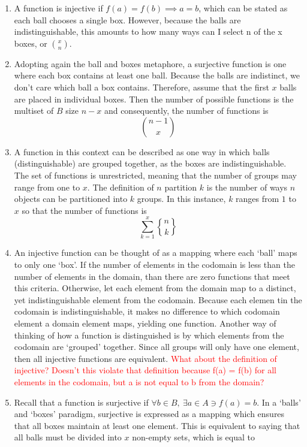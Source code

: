 \documentclass{article}
\begin{document}
\begin{enumerate}
\item A function is injective if $f(a) = f(b) \implies a = b$, which can be stated as each ball chooses a single box. However, because the balls are indistinguishable, this amounts to how many ways can I select n of the x boxes, or ${x \choose n}$.
\item Adopting again the ball and boxes metaphore, a surjective function is one where each box contains at least one ball. Because the balls are indistinct, we don't care which ball a box contains. Therefore, assume that the first $x$ balls are placed in individual boxes. Then the number of possible functions is the multiset of $B$ size $n - x$ and consequently, the number of functions is 
\begin{equation*}
	{n - 1 \choose x}
\end{equation*} 
\item A function in this context can be described as one way in which balls (distinguishable) are grouped together, as the boxes are indistinguishable. The set of functions is unrestricted, meaning that the number of groups may range from one to $x$.  The definition of $n$ partition $k$ is the number of ways $n$ objects can be partitioned into $k$ groups.  In this instance, $k$ ranges from $1$ to $x$ so that the number of functions is 
	\begin{equation*}
		\sum_{k=1}^x {n \brace k}
	\end{equation*}
\item An injective function can be thought of as a mapping where each `ball' maps to only one `box'.  If the number of elements in the codomain is less than the number of elements in the domain, than there are zero functions that meet this criteria. Otherwise, let each element from the domain map to a distinct, yet indistinguishable element from the codomain. Because each elemen tin the codomain is indistinguishable, it makes no difference to which codomain element a domain element maps, yielding one function. Another way of thinking of how a function is distinguished is by which elements from the codomain are `grouped' together.  Since all groups will only have one element, then all injective functions are equivalent. \textcolor{red}{What about the definition of injective?  Doesn't this violate that definition because f(a) = f(b) for all elements in the codomain, but a is not equal to b from the domain?}
\item Recall that a function is surjective if $\forall b \in B, \ \exists a \in A \ni f(a) = b$. In a `balls' and `boxes' paradigm, surjective is expressed as a mapping which ensures that all boxes maintain at least one element. This is equivalent to saying that all balls must be divided into $x$ non-empty sets, which is equal to 

\end{enumerate}
\end{document}

